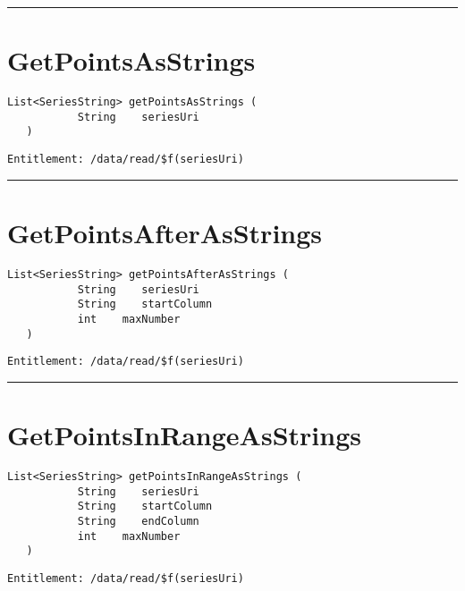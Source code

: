 \rule{12cm}{2pt}
\section{GetPointsAsStrings}
\label{Api:GetPointsAsStrings}
\begin{lstlisting}[style=nonumbers]
   List<SeriesString> getPointsAsStrings (
           String    seriesUri
   )
\end{lstlisting}
\begin{Verbatim}[formatcom=\color{Maroon}]
  Entitlement: /data/read/$f(seriesUri)
\end{Verbatim}



\rule{12cm}{2pt}
\section{GetPointsAfterAsStrings}
\label{Api:GetPointsAfterAsStrings}
\begin{lstlisting}[style=nonumbers]
   List<SeriesString> getPointsAfterAsStrings (
           String    seriesUri
           String    startColumn
           int    maxNumber
   )
\end{lstlisting}
\begin{Verbatim}[formatcom=\color{Maroon}]
  Entitlement: /data/read/$f(seriesUri)
\end{Verbatim}



\rule{12cm}{2pt}
\section{GetPointsInRangeAsStrings}
\label{Api:GetPointsInRangeAsStrings}
\begin{lstlisting}[style=nonumbers]
   List<SeriesString> getPointsInRangeAsStrings (
           String    seriesUri
           String    startColumn
           String    endColumn
           int    maxNumber
   )
\end{lstlisting}
\begin{Verbatim}[formatcom=\color{Maroon}]
  Entitlement: /data/read/$f(seriesUri)
\end{Verbatim}



